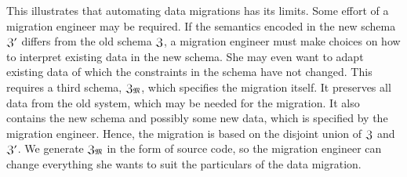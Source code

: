 \documentclass{elsarticle}
\begin{document}
   This illustrates that automating data migrations has its limits.
   Some effort of a migration engineer may be required.
   If the semantics encoded in the new schema $\mathfrak{Z}'$ differs from the old schema $\mathfrak{Z}$,
   a migration engineer must make choices on how to interpret existing data in the new schema.
   She may even want to adapt existing data of which the constraints in the schema have not changed.
   This requires a third schema, $\mathfrak{Z}_{\mathfrak{M}}$, which specifies the migration itself.
   It preserves all data from the old system, which may be needed for the migration.
   It also contains the new schema and possibly some new data, which is specified by the migration engineer.
   Hence, the migration is based on the disjoint union of $\mathfrak{Z}$ and $\mathfrak{Z}'$.
   We generate $\mathfrak{Z}_{\mathfrak{M}}$ in the form of source code, so the migration engineer can change everything she wants to suit the particulars of the data migration.
\end{document}
